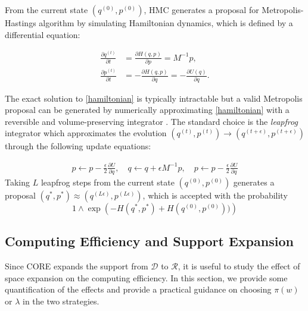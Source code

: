 \documentclass[10pt,fleqn]{article}
\newcommand{\mc}[1]{\mathcal{#1}}
\DeclareMathOperator{\1}{\mathbbm{1}}
\newcommand{\dt}{\epsilon} %
\newcommand{\mass}{M} %
\begin{document}
From the current state $(q^{(0)},p^{(0)})$, HMC generates a proposal for Metropolis-Hastings algorithm by simulating Hamiltonian dynamics, which is defined by a differential equation:

\begin{equation}
\begin{aligned}
\label{hamiltonian}
\frac{\partial q ^{(t)}}{\partial t} & =\frac{\partial H(q, p)}{\partial p} = \mass^{-1}p,\\
\frac{\partial p^{(t)}}{\partial t}& =-\frac{\partial H(q, p)}{\partial q} = -\frac{\partial U(q)}{\partial q}.
\end{aligned}
\end{equation}

The exact solution to \eqref{hamiltonian} is typically intractable but a valid Metropolis proposal can be generated by numerically approximating \eqref{hamiltonian} with a reversible and volume-preserving  integrator \citep{neal2011mcmc}. The standard choice is the \textit{leapfrog} integrator which approximates the evolution $(q^{(t)},p^{(t)}) \to (q^{(t + \dt)},p^{(t + \dt)})$ through the following update equations:

\begin{equation}
\begin{aligned}
\label{leap-frog}
p \leftarrow p - \frac{\dt}{2} \frac{\partial U}{\partial  q },\quad
q \leftarrow  q  + \dt \mass^{-1}p,\quad
p \leftarrow p -  \frac{\dt}{2}  \frac{\partial U}{\partial  q } 
\end{aligned}
\end{equation}
Taking $L$ leapfrog steps from the current state $(q^{(0)},p^{(0)})$ generates a proposal $(q^{*},p^{*}) \approx (q^{(L \dt)},p^{(L \dt)})$, which is accepted with the probability 
$$1\wedge \exp  \left( - H(q^{*},p^{*}) + H(q^{(0)},p^{(0)}))\right)$$


\subsection{Computing Efficiency and Support Expansion}

Since CORE expands the support from $\mc D$ to $\mc
R$, it is useful to study the effect of space expansion on the computing efficiency. In this section, we provide some  quantification of the effects and provide a practical guidance on choosing $\pi(w)$ or $\lambda$ in the
two strategies.
\end{document}
